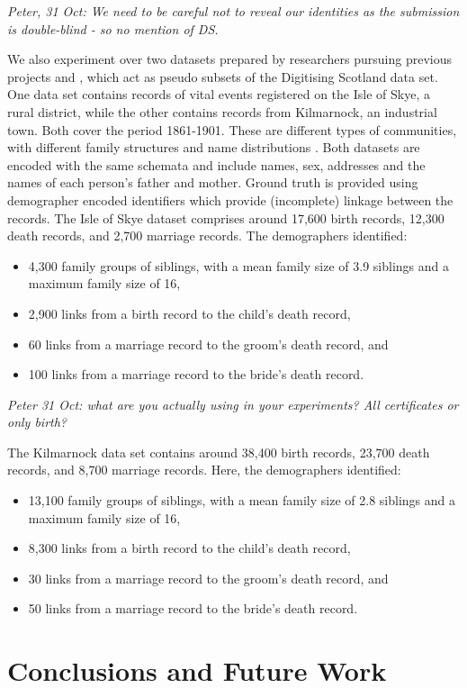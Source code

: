 \documentclass{llncs}
\begin{document}
\emph{Peter, 31 Oct: We need to be careful not to reveal our identities
as the submission is double-blind - so no mention of DS.}


We also experiment over two datasets prepared by researchers pursuing previous projects \cite{reid2002} and \cite{reid2006}, which act as pseudo subsets of the Digitising Scotland data set. One data set contains records of vital events registered on the Isle of Skye, a rural district, while the other contains records from Kilmarnock, an industrial town. Both cover the period 1861-1901. These are different types of communities, with different family structures and name distributions \cite{reid2002}. Both datasets are encoded with the same schemata and include names, sex, addresses and the names of each person's father and mother. Ground truth is provided using demographer encoded identifiers which provide (incomplete) linkage between the records.  The Isle of Skye dataset comprises around 17,600 birth records, 12,300 death records, and 2,700 marriage records.
The demographers  identified:
\begin{itemize}
\item 4,300 family groups of siblings, with a mean family size of 3.9 siblings and a maximum family size of 16,
\item 2,900 links from a birth record to the child's death record,
\item 60 links from a marriage record to the groom's death record, and
\item 100 links from a marriage record to the bride's death record.
\end{itemize}
\emph{Peter 31 Oct: what are you actually using in your experiments?
All certificates or only birth?}

The Kilmarnock data set contains around 38,400 birth records, 23,700 death records, and 8,700 marriage records. Here, the demographers identified:
\begin{itemize}
\item 13,100 family groups of siblings, with a mean family size of 2.8 siblings and a  maximum family size of 16,
\item 8,300 links from a birth record to the child's death record,
\item 30 links from a marriage record to the groom's death record, and
\item 50 links from a marriage record to the bride's death record.
\end{itemize}



\section{Conclusions and Future Work}
\label{sec-concl}



 
\end{document}
